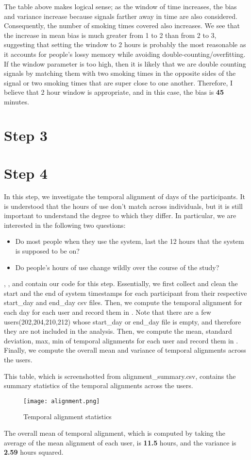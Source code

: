 \documentclass[11pt]{article}
\newcommand{\vsvs}{\vspace{0.5cm}}
\begin{document}
The table above makes logical sense; as the window of time increases, the bias and variance increase because signals farther away in time are also considered. Consequently, the number of smoking times covered also increases. We see that the increase in mean bias is much greater from 1 to 2 than from 2 to 3, suggesting that setting the window to 2 hours is probably the most reasonable as it accounts for people's lossy memory while avoiding double-counting/overfitting. If the window parameter is too high, then it is likely that we are double counting signals by matching them with two smoking times in the opposite sides of the signal or two smoking times that are super close to one another. Therefore, I believe that 2 hour window is appropriate, and in this case, the bias is \textbf{45} minutes.
\section{Step 3}
\section{Step 4}
In this step, we investigate the temporal alignment of days of the participants. It is understood that the hours of use don't match across individuals, but it is still important to understand the degree to which they differ. In particular, we are interested in the following two questions:
\begin{itemize}
	\item Do most people when they use the system, last the 12 hours that the system is supposed to be on?
	\item Do people's hours of use change wildly over the course of the study?
\end{itemize}

, , and  contain our code for this step. Essentially, we first collect and clean the start and the end of system timestamps for each participant from their respective start\_day and end\_day csv files. Then, we compute the temporal alignment for each day for each user and record them in . Note that there are a few users(202,204,210,212) whose start\_day or end\_day file is empty, and therefore they are not included in the analysis. Then, we compute the mean, standard deviation, max, min of temporal alignments for each user and record them in . Finally, we compute the overall mean and variance of temporal alignments across the users. 

\vsvs
This table, which is screenshotted from alignment\_summary.csv, contains the summary statistics of the temporal alignments across the users.
\begin{figure}[H]
    \centering
    \texttt{[image: alignment.png]}
    \caption{Temporal alignment statistics}
\end{figure}
The overall mean of temporal alignment, which is computed by taking the average of the mean alignment of each user, is \textbf{11.5} hours, and the variance is \textbf{2.59} hours squared.
\end{document}
